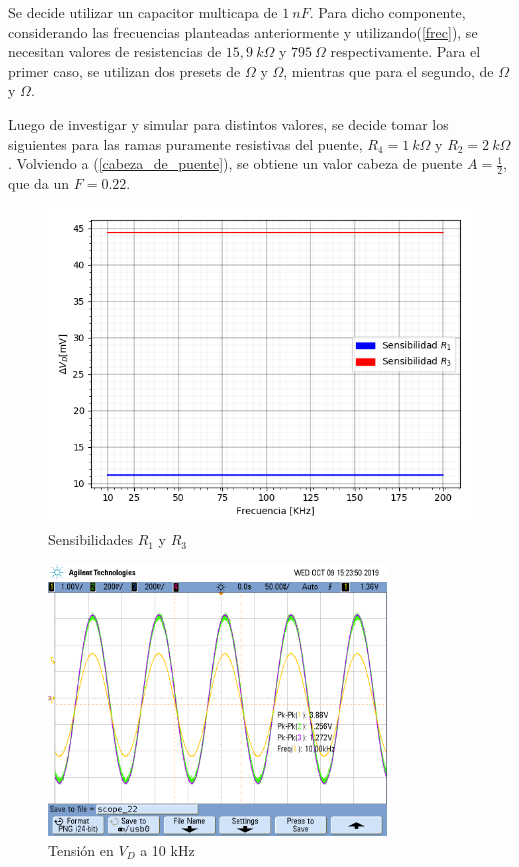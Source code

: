 Se decide utilizar un capacitor multicapa de $1 \ nF$. Para dicho componente, considerando las frecuencias planteadas anteriormente y utilizando(\ref{frec}), se necesitan valores de resistencias de $15,9 \ k\Omega$ y $795 \ \Omega$ respectivamente. Para el primer caso, se utilizan dos presets de $\Omega$ y $\Omega$, mientras que para el segundo, de $\Omega$ y $\Omega$.

Luego de investigar y simular para distintos valores, se decide tomar los siguientes para las ramas puramente resistivas del puente, $R_4= 1 \ k\Omega$ y $R_2= 2 \ k\Omega$. Volviendo a (\ref{cabeza_de_puente}), se obtiene un valor cabeza de puente $A=\frac{1}{2}$, que da un $F=0.22$.

\begin{figure}[H]
\centering
\includegraphics[scale=0.7]{Graficos/Sensibilidad}
\caption{Sensibilidades $R_1$ y $R_3$}
\label{fig:Sensibilidades}
\end{figure}



\begin{figure}[H]
\centering
\includegraphics[width=0.8\textwidth,trim={0.25cm 5cm  1 5cm},clip]{Mediciones/Tensiones_10_KHz}
\caption{Tensión en $V_D$ a 10 kHz}
\label{fig:Tensiones_10_KHz}
\end{figure}

